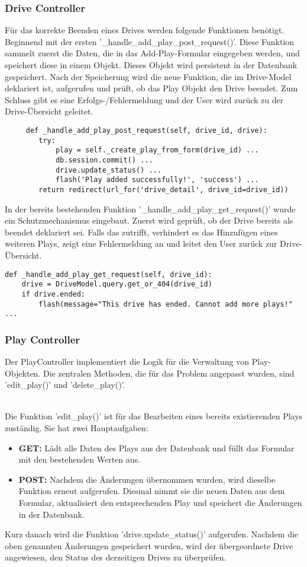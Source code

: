 \subsubsection{Drive Controller}
Für das korrekte Beenden eines Drives werden folgende Funktionen benötigt. Beginnend mit der ersten '\_handle\_add\_play\_post\_request()'. Diese Funktion sammelt zuerst die Daten, die in das Add-Play-Formular eingegeben werden, und speichert diese in einem Objekt. Dieses Objekt wird persistent in der Datenbank gespeichert. Nach der Speicherung wird die neue Funktion, die im Drive-Model deklariert ist, aufgerufen und prüft, ob das Play Objekt den Drive beendet. Zum Schluss gibt es eine Erfolgs-/Fehlermeldung und der User wird zurück zu der Drive-Übersicht geleitet.
\begin{verbatim}
     def _handle_add_play_post_request(self, drive_id, drive):
        try:
            play = self._create_play_from_form(drive_id) ...
            db.session.commit() ...
            drive.update_status() ... 
            flash('Play added successfully!', 'success') ...
        return redirect(url_for('drive_detail', drive_id=drive_id))
\end{verbatim}
\noindent
In der bereits bestehenden Funktion '\_handle\_add\_play\_get\_request()' wurde ein Schutzmechanismus eingebaut. Zuerst wird geprüft, ob der Drive bereits als beendet deklariert sei. Falls das zutrifft, verhindert es das Hinzufügen eines weiteren Plays, zeigt eine Fehlermeldung an und leitet den User zurück zur Drive-Übersicht.
\begin{verbatim}
def _handle_add_play_get_request(self, drive_id):
    drive = DriveModel.query.get_or_404(drive_id)
    if drive.ended:
        flash(message="This drive has ended. Cannot add more plays!" ...
\end{verbatim}
\subsubsection{Play Controller}
Der PlayController implementiert die Logik für die Verwaltung von Play-Objekten. Die zentralen Methoden, die für das Problem angepasst wurden, sind 'edit\_play()' und 'delete\_play()'.

\noindent
\\
Die Funktion 'edit\_play()' ist für das Bearbeiten eines bereits existierenden Plays zuständig. Sie hat zwei Hauptaufgaben:
\begin{itemize}
    \item \textbf{GET:} Lädt alle Daten des Plays aus der Datenbank und füllt das Formular mit den bestehenden Werten aus.
    \item \textbf{POST:} Nachdem die Änderungen übernommen wurden, wird dieselbe Funktion erneut aufgerufen. Diesmal nimmt sie die neuen Daten aus dem Formular, aktualisiert den entsprechenden Play und speichert die Änderungen in der Datenbank.
\end{itemize}
Kurz danach wird die Funktion 'drive.update\_status()' aufgerufen. Nachdem die oben genannten Änderungen gespeichert wurden, wird der übergeordnete Drive angewiesen, den Status des derzeitigen Drives zu überprüfen.

